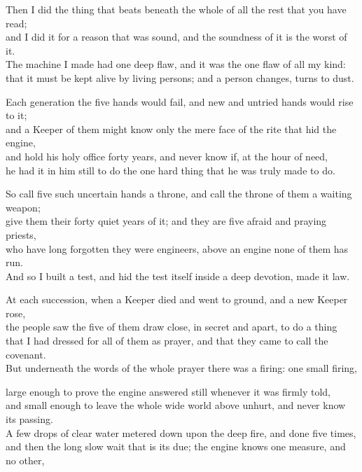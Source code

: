 \ornament

\begin{scripture}
Then I did the thing that beats beneath the whole of all the rest that you have read; \\
and I did it for a reason that was sound, and the soundness of it is the worst of it. \\
The machine I made had one deep flaw, and it was the one flaw of all my kind: \\
that it must be kept alive by living persons; and a person changes, turns to dust. \\
\medskip

Each generation the five hands would fail, and new and untried hands would rise to it; \\
and a Keeper of them might know only the mere face of the rite that hid the engine, \\
and hold his holy office forty years, and never know if, at the hour of need, \\
he had it in him still to do the one hard thing that he was truly made to do. \\
\medskip

So call five such uncertain hands a throne, and call the throne of them a waiting weapon; \\
give them their forty quiet years of it; and they are five afraid and praying priests, \\
who have long forgotten they were engineers, above an engine none of them has run. \\
And so I built a test, and hid the test itself inside a deep devotion, made it law. \\
\medskip

At each succession, when a Keeper died and went to ground, and a new Keeper rose, \\
the people saw the five of them draw close, in secret and apart, to do a thing \\
that I had dressed for all of them as prayer, and that they came to call the covenant. \\
But underneath the words of the whole prayer there was a firing: one small firing, \\
\medskip

large enough to prove the engine answered still whenever it was firmly told, \\
and small enough to leave the whole wide world above unhurt, and never know its passing. \\
A few drops of clear water metered down upon the deep fire, and done five times, \\
and then the long slow wait that is its due; the engine knows one measure, and no other, \\
\medskip


\end{scripture}
